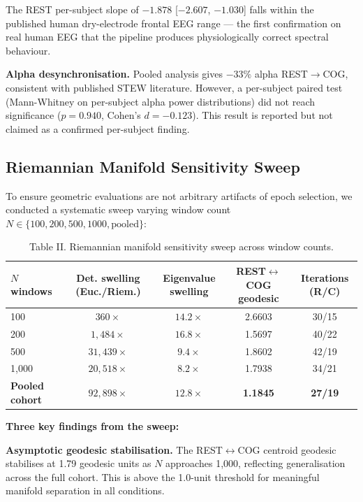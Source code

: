 \documentclass[11pt]{article}
\begin{document}
The REST per-subject slope of $-1.878$ [$-2.607$, $-1.030$] falls within the published human dry-electrode frontal EEG range --- the first confirmation on real human EEG that the pipeline produces physiologically correct spectral behaviour.

\textbf{Alpha desynchronisation.} Pooled analysis gives $-33\%$ alpha REST$\to$COG, consistent with published STEW literature. However, a per-subject paired test (Mann-Whitney on per-subject alpha power distributions) did not reach significance ($p = 0.940$, Cohen's $d = -0.123$). This result is reported but not claimed as a confirmed per-subject finding.

\subsection{Riemannian Manifold Sensitivity Sweep}

To ensure geometric evaluations are not arbitrary artifacts of epoch selection, we conducted a systematic sweep varying window count $N \in \{100, 200, 500, 1000, \text{pooled}\}$:

\begin{table}[htbp]
\centering
\small
\caption{Table II. Riemannian manifold sensitivity sweep across window counts.}
\begin{tabular}{lcccc}
\toprule
$N$ windows & Det. swelling (Euc./Riem.) & Eigenvalue swelling & REST$\leftrightarrow$COG geodesic & Iterations (R/C) \\
\midrule
100 & $360\times$ & $14.2\times$ & 2.6603 & 30/15 \\
200 & $1{,}484\times$ & $16.8\times$ & 1.5697 & 40/22 \\
500 & $31{,}439\times$ & $9.4\times$ & 1.8602 & 42/19 \\
1,000 & $20{,}518\times$ & $8.2\times$ & 1.7938 & 34/21 \\
\textbf{Pooled cohort} & \textbf{$92{,}898\times$} & \textbf{$12.8\times$} & \textbf{1.1845} & \textbf{27/19} \\
\bottomrule
\end{tabular}

\end{table}

\textbf{Three key findings from the sweep:}

\textbf{Asymptotic geodesic stabilisation.} The REST$\leftrightarrow$COG centroid geodesic stabilises at 1.79 geodesic units as $N$ approaches 1,000, reflecting generalisation across the full cohort. This is above the 1.0-unit threshold for meaningful manifold separation in all conditions.
\end{document}
